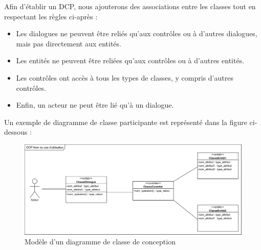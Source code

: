 \begin{itemize}
        Afin d’établir un DCP, nous ajouterons des associations entre les classes tout en respectant les règles ci-après : \cite{5}
        \begin{itemize}
            \item[\textbullet] Les dialogues ne peuvent être reliés qu'aux contrôles ou à d'autres dialogues, mais pas directement aux entités.
            \item [\textbullet] Les entités ne peuvent être reliées qu'aux contrôles ou à d'autres entités.
            \item [\textbullet] Les contrôles ont accès à tous les types de classes, y compris d'autres contrôles.
            \item [\textbullet] Enfin, un acteur ne peut être lié qu'à un dialogue.
        
        \end{itemize}
        Un exemple de diagramme de classe participante est représenté dans la figure ci-dessous :        
            \begin{figure}[h!]
                 \centering
                \includegraphics[scale=0.78]{images/DCP_exemple.png}
                 \caption{Modèle d'un diagramme de classe de conception}
                 \label{fig23}
            \end{figure}
        
        \clearpage
        
          

\end{itemize}
